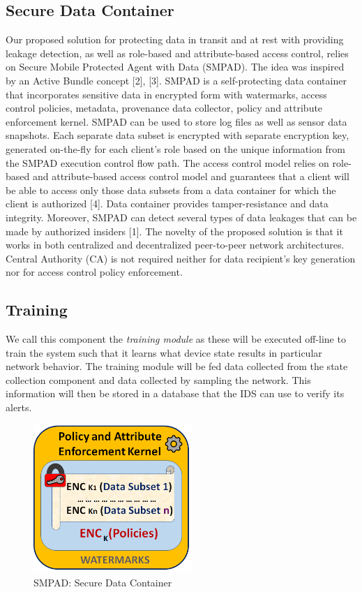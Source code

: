 \documentclass[conference]{IEEEtran}
\begin{document}
\subsection{Secure Data Container}
Our proposed solution for protecting data in transit and at rest with providing leakage detection, as well as role-based and attribute-based access control, relies on Secure Mobile Protected Agent with Data (SMPAD). The idea was inspired by an Active Bundle concept [2], [3]. SMPAD is a self-protecting data container that incorporates sensitive data in encrypted form with watermarks, access control policies, metadata, provenance data collector, policy and attribute enforcement kernel. SMPAD can be used to store log files as well as sensor data snapshots. Each separate data subset is encrypted with separate encryption key, generated on-the-fly for each client’s role based on the unique information from the SMPAD execution control flow path. The access control model relies on role-based and attribute-based access control model and guarantees that a client will be able to access only those data subsets from a data container for which the client is authorized [4]. Data container provides tamper-resistance and data integrity. Moreover, SMPAD can detect several types of data leakages that can be made by authorized insiders [1]. The novelty of the proposed solution is that it works in both centralized and decentralized peer-to-peer network architectures. Central Authority (CA) is not required neither for data recipient’s key generation nor for access control policy enforcement.

\subsection{Training}
We call this component the {\em training module} as these will be executed off-line to train the system such that it learns what device state results in particular network behavior.  The training module will be fed data collected from the state collection component and data collected by sampling the network. This information will then be stored in a database that the IDS can use to verify its alerts.


\begin{figure}[htbp]
\centering
\centerline{\includegraphics [width=6cm] {SMPAD-RelOK.png}}
\caption{SMPAD: Secure Data Container}
\label{fig}
\end{figure}
\end{document}
